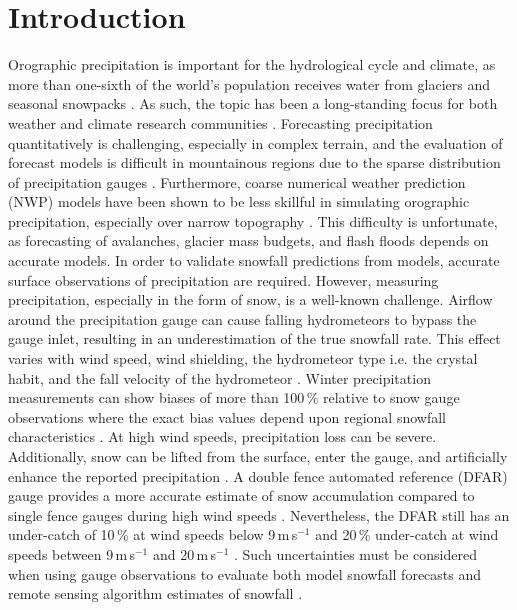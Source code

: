 \documentclass{ametsocV5}
\begin{document}
\section{Introduction}
    Orographic precipitation is important for the hydrological cycle and climate, as more than one-sixth of the world’s population receives water from glaciers and seasonal snowpacks \citep{barnett_potential_2005}. As such, the topic has been a long-standing focus for both weather and climate research communities \citep{stoelinga_improvement_2003,schar_orographic_2005,ranzi_hydrological_2007}.
%    
    Forecasting precipitation quantitatively is challenging, especially in complex terrain, and the evaluation of forecast models is difficult in mountainous regions due to the sparse distribution of precipitation gauges \citep{barstad_evaluation_2005}. Furthermore, coarse numerical weather prediction (NWP) models have been shown to be less skillful in simulating orographic precipitation, especially over narrow topography \citep{gowan_validation_2018}. This difficulty is unfortunate, as forecasting of avalanches, glacier mass budgets, and flash floods depends on accurate models. 
    In order to validate snowfall predictions from models, accurate surface observations of precipitation are required. However, measuring precipitation, especially in the form of snow, is a well-known challenge. Airflow around the precipitation gauge can cause falling hydrometeors to bypass the gauge inlet, resulting in an underestimation of the true snowfall rate. This effect varies with wind speed, wind shielding, the hydrometeor type i.e. the crystal habit, and the fall velocity of the hydrometeor \citep{theriault_dependence_2012,wolff_measurements_2013,colli_improved_2015}. Winter precipitation measurements can show biases of more than 100\,\% relative to snow gauge observations where the exact bias values depend upon regional snowfall characteristics \citep{kochendorfer_analysis_2017}. At high wind speeds, precipitation loss can be severe. Additionally, snow can be lifted from the surface, enter the gauge, and artificially enhance the reported precipitation \citep{nitu_iom_2018}. A double fence automated reference (DFAR) gauge provides a more accurate estimate of snow accumulation compared to single fence gauges during high wind speeds \citep{wolff_derivation_2015,kochendorfer_analysis_2017}. Nevertheless, the DFAR still has an under-catch of 10\,\% at wind speeds below 9\,m\,s$^{-1}$ and 20\,\% under-catch at wind speeds between 9\,m\,s$^{-1}$ and 20\,m\,s$^{-1}$ \citep{nitu_iom_2018}. Such uncertainties must be considered when using gauge observations to evaluate both model snowfall forecasts and remote sensing algorithm estimates of snowfall \citep{wolff_derivation_2015}. 
    
\end{document}
